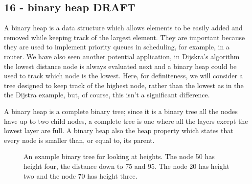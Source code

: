 \documentclass[11pt,a4paper]{scrartcl}
\begin{document}

\subsection*{16 - binary heap DRAFT}

A binary heap is a data structure which allows elements to be easily
added and removed while keeping track of the largest element. They are
important because they are used to implement priority queues in
scheduling, for example, in a router. We have also seen another
potential application, in Dijskra's algorithm the lowest distance node
is always evaluated next and a binary heap could be used to track
which node is the lowest. Here, for definiteness, we will consider a
tree designed to keep track of the highest node, rather than the
lowest as in the the Dijstra example, but, of course, this isn't a
significant difference.

A binary heap is a complete binary tree; since it is a binary tree all
the nodes have up to two child nodes, a complete tree is one where all
the layers except the lowest layer are full. A binary heap also the
heap property which states that every node is smaller than, or equal
to, its parent.















\begin{figure}
   \begin{center}
\end{center}
\caption{An example binary tree for looking at heights. The node 50
  has height four, the distance down to 75 and 95. The node 20 has
  height two and the node 70 has height
  three.\label{fig_example_tree}}
\end{figure}
\end{document}
